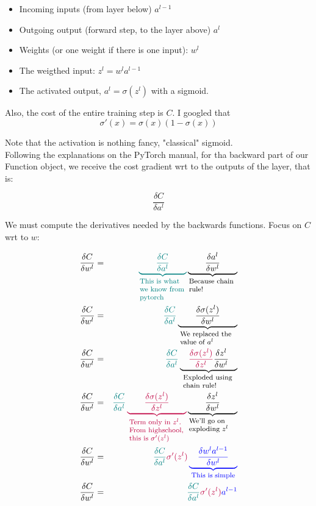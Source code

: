 \documentclass{article}
\newcommand{\explain}[2]{\underbrace{{#1}}_{\parbox{\widthof{\ensuremath{#1}}}{\footnotesize\raggedright #2}}}
\begin{document}
\begin{itemize}
	\item Incoming inputs (from layer below) $a^{l-1}$ 
	\item Outgoing output (forward step, to the layer above) $a^l$ 
	\item Weights (or one weight if there is one input): $w^l$
	\item The weigthed input: $z^l =  w^l a^{l-1}$
	\item The activated output, $a^l{=}\sigma (z^l)$ with a sigmoid.
\end{itemize}

Also, the cost of the entire training step is $C$.
I googled that
\begin{equation}
	\sigma' (x){=}\sigma(x)\left(1-\sigma(x)\right)
\end{equation}

Note that the activation is nothing fancy, "classical" sigmoid.\\

Following the explanations on the PyTorch manual, for tha backward part of our Function object, we receive the cost gradient wrt to the outputs of the layer, that is:


\begin{equation}
	\frac{\delta C}{\delta a^l}
\end{equation}

We must compute the derivatives needed by the backwards functions. Focus on $C$ wrt to $w$:

\begin{eqnarray}
	\frac{\delta C}{\delta w^l}&=&\color{teal}\explain{\qquad\frac{\delta C}{\delta a^l}\qquad}{This is what we know from pytorch}
	\normalcolor\explain{\qquad\frac{\delta a^l}{\delta w^l}\qquad}{Because chain rule!}\\
	\frac{\delta C}{\delta w^l}&=&\color{teal}\frac{\delta C}{\delta a^l}
	\normalcolor \explain{\qquad\frac{\delta \sigma(z^l)}{\delta w^l}\qquad}{We replaced the value of $a^l$}\\
	\frac{\delta C}{\delta w^l}&=&\color{teal}\frac{\delta C}{\delta a^l}
	\normalcolor \explain{\quad \textcolor{purple}{\frac{\delta \sigma(z^l)}{\delta z^l}}\frac{\delta z^l}{\delta w^l}\quad}{Exploded using chain rule!}\\
	\frac{\delta C}{\delta w^l}&=&\color{teal}\frac{\delta C}{\delta a^l}
	\color{purple}\explain{\qquad\frac{\delta \sigma(z^l)}{\delta z^l}\qquad}{Term only in $z^l$. From highschool, this is $\sigma'(z^l)$} \normalcolor \explain{\qquad\frac{\delta z^l}{\delta w^l}\qquad}{We'll go on exploding $z^l$}\\	
	\frac{\delta C}{\delta w^l}&=&\color{teal}\frac{\delta C}{\delta a^l} \color{purple} \sigma'(z^l)
	\color{blue}\explain{\quad\frac{\delta w^l a^{l-1}}{\delta w^l}\quad}{This is simple}\\	
	\frac{\delta C}{\delta w^l}&=&\color{teal}\frac{\delta C}{\delta a^l} \color{purple}\sigma'(z^l) \color{blue}a^{l-1}	
\end{eqnarray}
\end{document}
